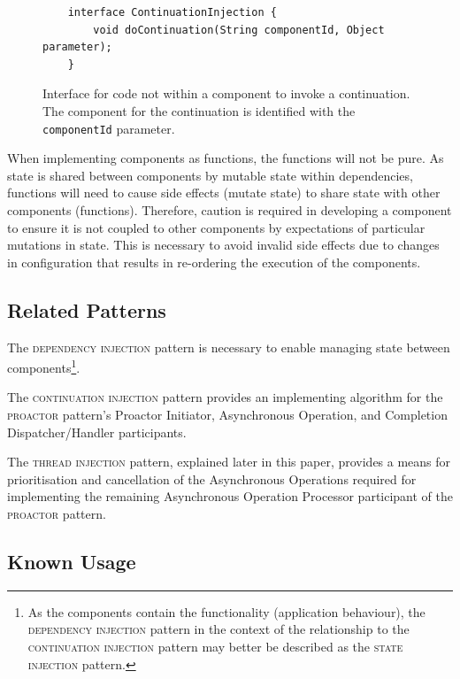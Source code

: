 \documentclass[prodmode]{style/acmlarge}
\begin{document}
\begin{figure}[tp]
\begin{verbatim}
    interface ContinuationInjection {
        void doContinuation(String componentId, Object parameter);
    }
\end{verbatim}
\caption{Interface for code not within a component to invoke a continuation.  The component for the continuation is identified with the \texttt{componentId} parameter.}
\label{fig:ContinuationInjectionInterface}
\end{figure}

When implementing components as functions, the functions will not be pure.  As
state is shared between components by mutable state within dependencies,
functions will need to cause side effects (mutate state) to share state with
other components (functions).  Therefore, caution is required in developing a
component to ensure it is not coupled to other components by expectations of
particular mutations in state.  This is necessary to avoid invalid side effects
due to changes in configuration that results in re-ordering the execution of the
components.


\subsection{Related Patterns}

The \textsc{dependency injection} pattern \cite{ioc} is necessary to enable
managing state between components\footnote{As the components contain the
functionality (application behaviour), the \textsc{dependency injection} pattern
in the context of the relationship to the \textsc{continuation injection}
pattern may better be described as the \textsc{state injection} pattern.}.

The \textsc{continuation injection} pattern provides an implementing algorithm
for the \textsc{proactor} pattern's Proactor Initiator, Asynchronous Operation,
and Completion Dispatcher/Handler participants.

The \textsc{thread injection} pattern, explained later in this paper, provides a
means for prioritisation and cancellation of the Asynchronous Operations
required for implementing the remaining Asynchronous Operation Processor
participant of the \textsc{proactor} pattern.


\subsection{Known Usage}
\end{document}
